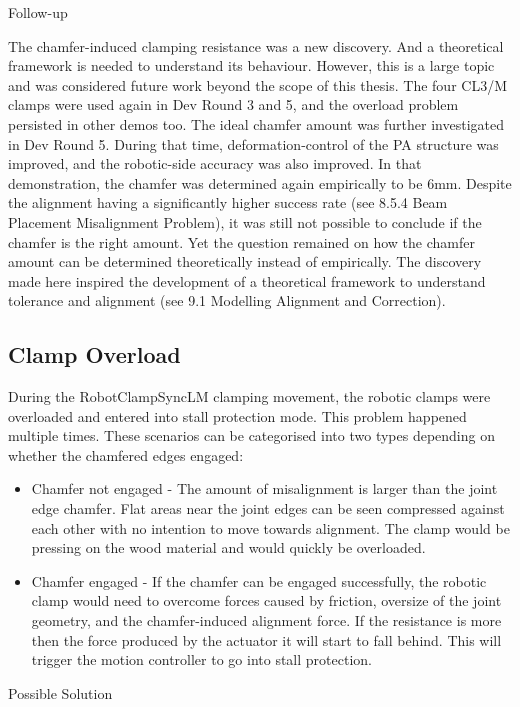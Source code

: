 Follow-up

The chamfer-induced clamping resistance was a new discovery. And a theoretical framework is needed to understand its behaviour. However, this is a large topic and was considered future work beyond the scope of this thesis. The four CL3/M clamps were used again in Dev Round 3 and 5, and the overload problem persisted in other demos too. 
The ideal chamfer amount was further investigated in Dev Round 5. During that time, deformation-control of the PA structure was improved, and the robotic-side accuracy was also improved. In that demonstration, the chamfer was determined again empirically to be 6mm. Despite the alignment having a significantly higher success rate (see 8.5.4 Beam Placement Misalignment Problem), it was still not possible to conclude if the chamfer is the right amount.
Yet the question remained on how the chamfer amount can be determined theoretically instead of empirically. The discovery made here inspired the development of a theoretical framework to understand tolerance and alignment (see 9.1 Modelling Alignment and Correction).

\subsection{Clamp Overload}

During the RobotClampSyncLM clamping movement, the robotic clamps were overloaded and entered into stall protection mode. This problem happened multiple times. These scenarios can be categorised into two types depending on whether the chamfered edges engaged:
\begin{itemize}
    \item Chamfer not engaged - The amount of misalignment is larger than the joint edge chamfer. Flat areas near the joint edges can be seen compressed against each other with no intention to move towards alignment. The clamp would be pressing on the wood material and would quickly be overloaded.
    \item Chamfer engaged - If the chamfer can be engaged successfully, the robotic clamp would need to overcome forces caused by friction, oversize of the joint geometry, and the chamfer-induced alignment force. If the resistance is more then the force produced by the actuator it will start to fall behind. This will trigger the motion controller to go into stall protection.
\end{itemize}

Possible Solution

